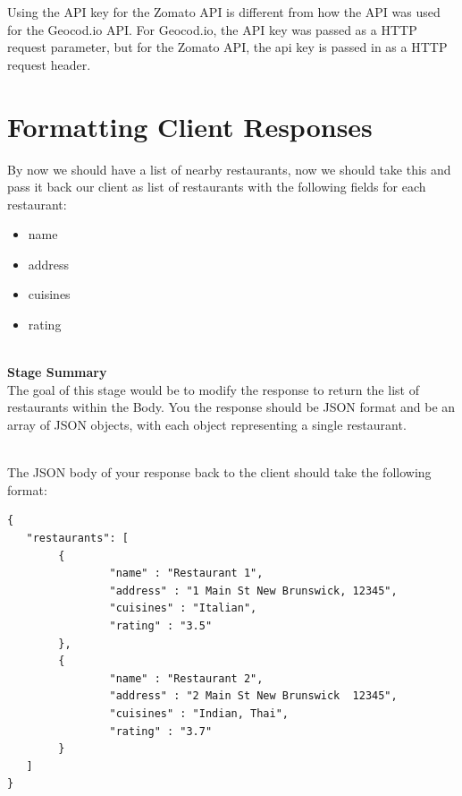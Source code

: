 \documentclass{article}
\begin{document}
\begin{info}
Using the API key for the Zomato API is different from how the API was used for the Geocod.io API. For Geocod.io, the API key was passed as a HTTP request parameter, but for the Zomato API, the api key is passed in as a HTTP request header. 
\end{info}





\section{Formatting Client Responses}
By now we should have a list of nearby restaurants, now we should take this and pass it back our client as list of restaurants with the following fields for each restaurant:
\begin{itemize}
\item name
\item address
\item cuisines
\item rating
\end{itemize}

\-\ \\
\textbf{Stage Summary}\\
The goal of this stage would be to modify the response to return the list of restaurants within the Body. You the response should be JSON format and be an array of JSON objects, with each object representing a single restaurant. 

\-\ \\
The JSON body of your response back to the client should take the following format:

\begin{verbatim}
{ 
   "restaurants": [
        { 
                "name" : "Restaurant 1",  
                "address" : "1 Main St New Brunswick, 12345", 
                "cuisines" : "Italian", 
                "rating" : "3.5" 
        },
        { 
                "name" : "Restaurant 2", 
                "address" : "2 Main St New Brunswick  12345", 
                "cuisines" : "Indian, Thai", 
                "rating" : "3.7" 
        }
   ]
}
\end{verbatim}


\end{document}
